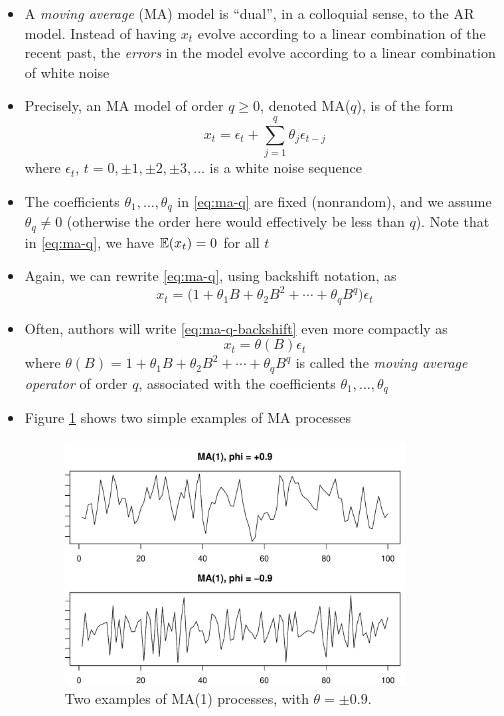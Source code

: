 \documentclass{article}
\begin{document}
\begin{itemize}
\item A \emph{moving average} (MA) model is ``dual'', in a colloquial sense, to
  the AR model. Instead of having $x_t$ evolve according to a linear combination
  of the recent past, the \emph{errors} in the model evolve according to a
  linear combination of white noise

\item Precisely, an MA model of order $q \geq 0$, denoted MA($q$), is of the
  form 
  \begin{equation}
  \label{eq:ma-q}
  x_t = \epsilon_t + \sum_{j=1}^q \theta_j \epsilon_{t-j} 
  \end{equation}
  where $\epsilon_t$, $t = 0, \pm 1, \pm 2, \pm 3, \dots$ is a white noise
  sequence

\item The coefficients $\theta_1,\dots,\theta_q$ in \eqref{eq:ma-q} are fixed
  (nonrandom), and we assume $\theta_q \not= 0$ (otherwise the order here would 
  effectively be less than $q$). Note that in \eqref{eq:ma-q}, we have $\mathbb{E}(x_t)
  = 0$ for all $t$ 

\item Again, we can rewrite \eqref{eq:ma-q}, using backshift notation, as 
  \begin{equation}
  \label{eq:ma-q-backshift}
  x_t = \Big(1 + \theta_1 B + \theta_2 B^2 + \cdots + \theta_q B^q \Big)
  \epsilon_t  
  \end{equation}

\item Often, authors will write \eqref{eq:ma-q-backshift} even more compactly as   
  \begin{equation}
  \label{eq:ma-q-phi}
  x_t = \theta(B) \epsilon_t 
  \end{equation}
  where $\theta(B) = 1 + \theta_1 B + \theta_2 B^2 + \cdots + \theta_q B^q$ is
  called the \emph{moving average operator} of order $q$, associated with the
  coefficients $\theta_1,\dots,\theta_q$

\item Figure \ref{fig:ma} shows two simple examples of MA processes

\begin{figure}[htb]
\centering
\includegraphics[width=0.85\textwidth]{fig/ma-1.pdf}
\caption{Two examples of MA(1) processes, with $\theta = \pm 0.9$.}
\label{fig:ma}
\end{figure}
\end{itemize}
\end{document}
